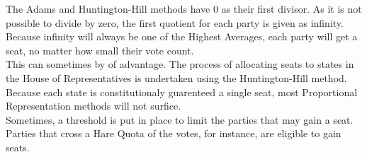 \documentclass{article}
\begin{document}
    The Adams and Huntington-Hill methods have 0 as their first divisor. As it is not possible to divide by zero, the first quotient for each party is given as infinity. Because infinity will always be one of the Highest Averages, each party will get a seat, no matter how small their vote count.\\

    This can sometimes by of advantage. The process of allocating seats to states in the House of Representatives is undertaken using the Huntington-Hill method. Because each state is constitutionaly guarenteed a single seat, most Proportional Representation methods will not surfice.\\

    Sometimes, a threshold is put in place to limit the parties that may gain a seat. Parties that cross a Hare Quota of the votes, for instance, are eligible to gain seats.\\
\end{document}
